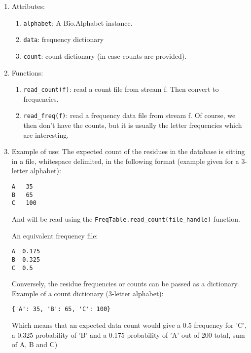 \begin{enumerate}

  \item Attributes:


  \begin{enumerate}
    \item \verb|alphabet|: A Bio.Alphabet instance.
    \item \verb|data|: frequency dictionary
    \item \verb|count|: count dictionary (in case counts are provided).
  \end{enumerate}

  \item Functions:
  \begin{enumerate}
    \item \verb|read_count(f)|: read a count file from stream f. Then convert to frequencies.
    \item \verb|read_freq(f)|: read a frequency data file from stream f. Of course, we then don't have the counts, but it is usually the letter frequencies which are interesting.
  \end{enumerate}

  \item Example of use:
  The expected count of the residues in the database is sitting in a file, whitespace delimited, in the following format (example given for a 3-letter alphabet):

\begin{verbatim}
A   35
B   65
C   100
\end{verbatim}

And will be read using the \verb|FreqTable.read_count(file_handle)| function.

An equivalent frequency file:

\begin{verbatim}
A  0.175
B  0.325
C  0.5
\end{verbatim}

Conversely, the residue frequencies or counts can be passed as a dictionary.
Example of a count dictionary (3-letter alphabet):

\begin{verbatim}
{'A': 35, 'B': 65, 'C': 100}
\end{verbatim}

Which means that an expected data count would give a 0.5 frequency
for 'C', a 0.325 probability of 'B' and a 0.175 probability of 'A'
out of 200 total, sum of A, B and C)


\end{enumerate}
